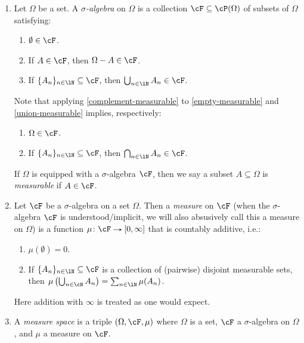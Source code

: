 \begin{definitions}
  \begin{enumerate}
  \item \label{sigma-algebra}
    Let $\Omega$ be a set. A \emph{$\sigma$-algebra} on $\Omega$ is a collection $\cF \subseteq \cP(\Omega)$ of subsets of $\Omega$ satisfying:
    \begin{enumerate}
    \item \label{empty-measurable} $\emptyset \in \cF$.
    \item \label{complement-measurable} If $A \in \cF$, then $\Omega - A \in \cF$.
    \item \label{union-measurable}
      If $\{A_n\}_{n \in \lN} \subseteq \cF$, then $\bigcup_{n \in \lN} A_n \in \cF$.
    \end{enumerate}
    Note that applying \cref{complement-measurable} to \cref{empty-measurable} and \cref{union-measurable} implies, respectively:
    \begin{enumerate}[resume]
    \item \label{whole-measurable} $\Omega \in \cF$.
    \item \label{intersection-measurable}
      If $\{A_n\}_{n \in \lN} \subseteq \cF$, then $\bigcap_{n \in \lN} A_n \in \cF$.
    \end{enumerate}

    If $\Omega$ is equipped with a $\sigma$-algebra $\cF$, then we say a subset $A \subseteq \Omega$ is \emph{measurable} if $A \in \cF$.

  \item \label{measure}
    Let $\cF$ be a $\sigma$-algebra on a set $\Omega$. Then a \emph{measure} on $\cF$ (when the $\sigma$-algebra $\cF$ is understood/implicit, we will also absusively call this a measure on $\Omega$) is a function $\mu \c \cF \to [0, \infty]$ that is countably additive, i.e.:
    \begin{enumerate}
    \item $\mu(\emptyset) = 0$.
    \item If $\{A_n\}_{n \in \lN} \subseteq \cF$ is a collection of (pairwise) disjoint measurable sets, then $\mu\l(\bigcup_{n \in \cN} A_n\r) = \sum_{n \in \lN} \mu(A_n)$.
    \end{enumerate}
    Here addition with $\infty$ is treated as one would expect.

  \item \label{measure-space}
    A \emph{measure space} is a triple $(\Omega, \cF, \mu)$ where $\Omega$ is a set, $\cF$ a $\sigma$-algebra on $\Omega$, and $\mu$ a measure on $\cF$.
  \end{enumerate}
\end{definitions}

